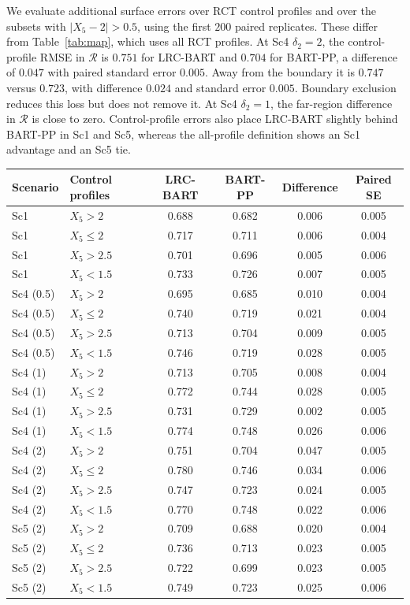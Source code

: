 \documentclass[11pt]{article}
\theoremstyle{definition}
\theoremstyle{plain}
\begin{document}
We evaluate additional surface errors over RCT control profiles and over the subsets with $|X_5-2|>0.5$, using the first $200$ paired replicates. These differ from Table~\ref{tab:map}, which uses all RCT profiles. At Sc4 $\delta_2=2$, the control-profile RMSE in $\mathcal R$ is $0.751$ for LRC-BART and $0.704$ for BART-PP, a difference of $0.047$ with paired standard error $0.005$. Away from the boundary it is $0.747$ versus $0.723$, with difference $0.024$ and standard error $0.005$. Boundary exclusion reduces this loss but does not remove it. At Sc4 $\delta_2=1$, the far-region difference in $\mathcal R$ is close to zero. Control-profile errors also place LRC-BART slightly behind BART-PP in Sc1 and Sc5, whereas the all-profile definition shows an Sc1 advantage and an Sc5 tie.

\begin{center}\scriptsize
\begin{tabular}{llcccc}
\toprule
Scenario & Control profiles & LRC-BART & BART-PP & Difference & Paired SE \\
\midrule
Sc1 & $X_5>2$ & 0.688 & 0.682 & 0.006 & 0.005 \\
Sc1 & $X_5\le2$ & 0.717 & 0.711 & 0.006 & 0.004 \\
Sc1 & $X_5>2.5$ & 0.701 & 0.696 & 0.005 & 0.006 \\
Sc1 & $X_5<1.5$ & 0.733 & 0.726 & 0.007 & 0.005 \\
Sc4 (0.5) & $X_5>2$ & 0.695 & 0.685 & 0.010 & 0.004 \\
Sc4 (0.5) & $X_5\le2$ & 0.740 & 0.719 & 0.021 & 0.004 \\
Sc4 (0.5) & $X_5>2.5$ & 0.713 & 0.704 & 0.009 & 0.005 \\
Sc4 (0.5) & $X_5<1.5$ & 0.746 & 0.719 & 0.028 & 0.005 \\
Sc4 (1) & $X_5>2$ & 0.713 & 0.705 & 0.008 & 0.004 \\
Sc4 (1) & $X_5\le2$ & 0.772 & 0.744 & 0.028 & 0.005 \\
Sc4 (1) & $X_5>2.5$ & 0.731 & 0.729 & 0.002 & 0.005 \\
Sc4 (1) & $X_5<1.5$ & 0.774 & 0.748 & 0.026 & 0.006 \\
Sc4 (2) & $X_5>2$ & 0.751 & 0.704 & 0.047 & 0.005 \\
Sc4 (2) & $X_5\le2$ & 0.780 & 0.746 & 0.034 & 0.006 \\
Sc4 (2) & $X_5>2.5$ & 0.747 & 0.723 & 0.024 & 0.005 \\
Sc4 (2) & $X_5<1.5$ & 0.770 & 0.748 & 0.022 & 0.006 \\
Sc5 (2) & $X_5>2$ & 0.709 & 0.688 & 0.020 & 0.004 \\
Sc5 (2) & $X_5\le2$ & 0.736 & 0.713 & 0.023 & 0.005 \\
Sc5 (2) & $X_5>2.5$ & 0.722 & 0.699 & 0.023 & 0.005 \\
Sc5 (2) & $X_5<1.5$ & 0.749 & 0.723 & 0.025 & 0.006 \\
\bottomrule
\end{tabular}
\end{center}
\end{document}
